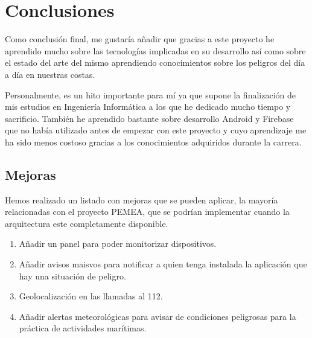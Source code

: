 \chapter{Conclusiones}
\label{conclusiones}


Como conclusión final, me gustaría añadir que gracias a este proyecto
 he aprendido mucho sobre las tecnologías implicadas en su desarrollo
así como sobre el estado del arte del mismo aprendiendo
conocimientos sobre los peligros del día a día en nuestras costas.

Personalmente, es un hito importante para mí ya que supone la
 finalización de mis estudios en Ingeniería Informática a los que he
 dedicado mucho tiempo y sacrificio. También he aprendido bastante
 sobre desarrollo Android y Firebase que no había utilizado antes
 de empezar con este proyecto y cuyo aprendizaje me ha sido
 menos costoso gracias a los conocimientos adquiridos durante la carrera.


\section{Mejoras}

Hemos realizado un listado con mejoras que se pueden aplicar,
 la mayoría relacionadas con el proyecto PEMEA, que se podrían
 implementar cuando la arquitectura este completamente disponible.

\begin{enumerate}
\item Añadir un panel para poder monitorizar dispositivos.
\item Añadir avisos maisvos para notificar a quien tenga instalada
 la aplicación que hay una situación de peligro.
\item Geolocalización en las llamadas al 112.
\item Añadir alertas meteorológicas para avisar de condiciones
 peligrosas para la práctica de actividades marítimas.
\end{enumerate}
